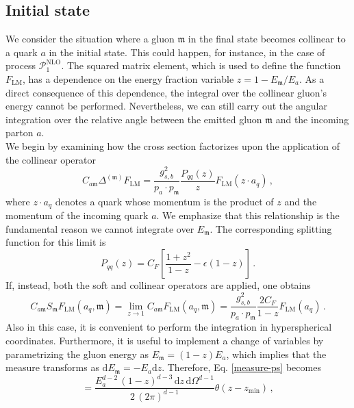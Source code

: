 \documentclass[a4paper, 12pt]{book}
\newcommand{\um}{\mathfrak{m}}
\begin{document}
\subsection{Initial state}
\label{initial-state-section}
We consider the situation where a gluon $\um$ in the final state becomes collinear to a quark $a$ in the initial state. This could happen, for instance, in the case of process $\mathcal{P}_1^{\mathrm{NLO}}$. The squared matrix element, which is used to define the function $F_{\mathrm{LM}}$, has a dependence on the energy fraction variable $z=1-E_\um/E_a$. As a direct consequence of this dependence, the integral over the collinear gluon's energy cannot be performed. Nevertheless, we can still carry out the angular integration over the relative angle between the emitted gluon $\um$ and the incoming parton $a$. \\
We begin by examining how the cross section factorizes upon the application of the collinear operator
\begin{equation}
  C_{a\um} \Delta^{(\um)} F_{\mathrm{LM}} = \frac{g^2_{s,b}}{p_a \cdot p_\um} \frac{P_{qq}(z)}{z} F_{\mathrm{LM}}(z\cdot a_q) \, ,
\end{equation}
where $z \cdot a_q$ denotes a quark whose momentum is the product of $z$ and the momentum of the incoming quark $a$. We emphasize that this relationship is the fundamental reason we cannot integrate over $E_\um$. The corresponding splitting function for this limit is
\begin{equation}
  P_{qq}(z) = C_F \left[\frac{1+z^2}{1-z}-\epsilon(1-z)\right]\, .
\end{equation}
If, instead, both the soft and collinear operators are applied, one obtains
\begin{equation}
  C_{a\um} S_{\um} F_{\mathrm{LM}} (a_q, \um) = \lim_{z \to 1}  C_{a\um} F_{\mathrm{LM}} (a_q, \um)= \frac{g^2_{s,b}}{p_a \cdot p_\um} \frac{2 C_F}{1-z} F_{\mathrm{LM}}( a_q) \, .
\end{equation}
Also in this case, it is convenient to perform the integration in hyperspherical coordinates. Furthermore, it is useful to implement a change of variables by parametrizing the gluon energy as $E_\um = (1-z)E_a$, which implies that the measure transforms as $\mathrm{d}E_\um=-E_a \mathrm{d}z$. Therefore, Eq. \ref{measure-ps} becomes
\begin{equation}
  [\mathrm{d}p_\um] = \frac{E_a^{d-2}\, (1-z)^{d-3} \, \mathrm{d}z \, \mathrm{d}\Omega ^{d-1}}{2 \, (2\pi)^{d-1}} \theta(z-z_{\mathrm{min}}) \, ,
\end{equation}
\end{document}
